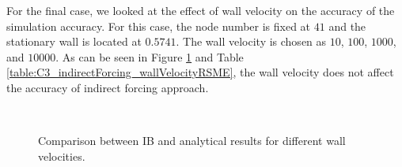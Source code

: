 For the final case, we looked at the effect of wall velocity on the accuracy of the simulation accuracy. For this case, the node number is fixed at $41$ and the stationary wall is located at $0.5741$. The wall velocity is chosen as $10$, $100$, $1000$, and $10000$. As can be seen in Figure \ref{fig:C3_indirectForcing_wallVelocity} and Table \ref{table:C3_indirectForcing_wallVelocityRSME}, the wall velocity does not affect the accuracy of indirect forcing approach.

\begin{figure}[H]
	\centering
	\quad
	\\
	\quad
	\caption{Comparison between IB and analytical results for different wall velocities.}
	\label{fig:C3_indirectForcing_wallVelocity}
\end{figure}

